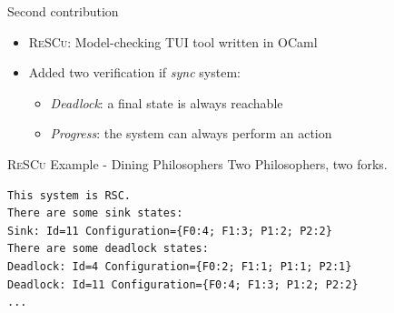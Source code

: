 \documentclass{beamer}
\begin{document}
\begin{frame}[fragile]{Second contribution}

	\begin{itemize}
		\item \textsc{ReSCu}: Model-checking TUI tool written in OCaml
		\bigskip
		\item Added two verification if \emph{sync} system:
		\begin{itemize}
			\item \emph{Deadlock}: a final state is always reachable
			\item \emph{Progress}: the system can always perform an action
		\end{itemize} 
	\end{itemize}
	
\end{frame}

\begin{frame}[fragile]{\textsc{ReSCu} Example - Dining Philosophers}
	Two Philosophers, two forks.

	\bigskip

	\begin{lstlisting}
This system is RSC.
There are some sink states:
Sink: Id=11 Configuration={F0:4; F1:3; P1:2; P2:2}
There are some deadlock states:
Deadlock: Id=4 Configuration={F0:2; F1:1; P1:1; P2:1}
Deadlock: Id=11 Configuration={F0:4; F1:3; P1:2; P2:2}
...
    \end{lstlisting}
\end{frame}
\end{document}
